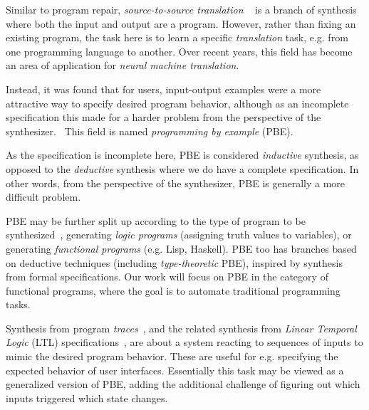 \documentclass{article}
\begin{document}
Similar to program repair, \emph{source-to-source translation}%
~\citep{loveman1977program,albrecht1980source,partsch1983program,waters1988program,visser2005survey,czarnecki2006feature,chen2018tree}
is a branch of synthesis where both the input and output are a program.
However, rather than fixing an existing program,
the task here is to learn a specific \emph{translation} task,
e.g. from one programming language to another.
Over recent years, this field has become an area of application for \emph{neural machine translation}.%
~\citep{cho2014nmt,kim2019translating}


Instead, it was found that for users, input-output examples were a more attractive way to specify desired program behavior,
although as an incomplete specification this made for a harder problem from the perspective of the synthesizer.~\citep{bodik2013algorithmic}
This field is named \emph{programming by example} (PBE).

As the specification is incomplete here, PBE is considered \emph{inductive} synthesis, as opposed to the \emph{deductive} synthesis where we do have a complete specification.
In other words, from the perspective of the synthesizer, PBE is generally a more difficult problem.

PBE may be further split up according to the type of program to be synthesized~\citep{bodik2013algorithmic},
generating \emph{logic programs} (assigning truth values to variables),
or generating \emph{functional programs} (e.g. Lisp, Haskell).
PBE too has branches based on deductive techniques (including \emph{type-theoretic} PBE),
inspired by synthesis from formal specifications.
Our work will focus on PBE in the category of functional programs,
where the goal is to automate traditional programming tasks.


Synthesis from program \emph{traces}~\citep{koskimies1994automatic},
and the related synthesis from \emph{Linear Temporal Logic} (LTL)
specifications~\citep{camacho2019towards}, are about
a system reacting to sequences of inputs to mimic the desired program behavior.
These are useful for e.g. specifying the expected behavior of user interfaces.
Essentially this task may be viewed as a generalized version of PBE,
adding the additional challenge of figuring out which inputs triggered which state changes.
\end{document}
